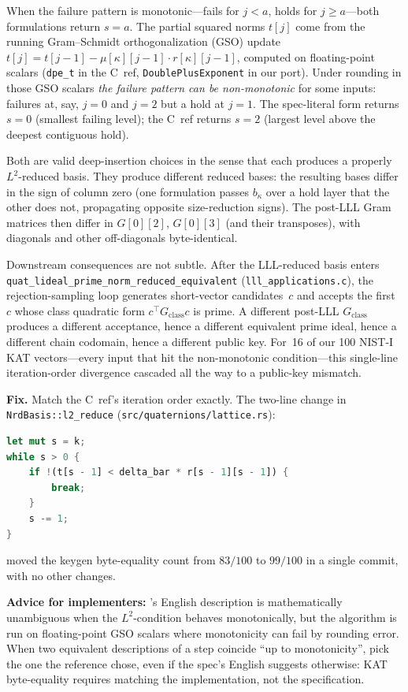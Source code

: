 When the failure pattern is monotonic---fails for $j < a$, holds for
$j \ge a$---both formulations return $s = a$.  The partial squared
norms $t[j]$ come from the running Gram--Schmidt orthogonalization
(GSO) update $t[j] = t[j-1] - \mu[\kappa][j-1] \cdot r[\kappa][j-1]$,
computed on floating-point scalars (\texttt{dpe\_t} in the C~ref,
\texttt{DoublePlusExponent} in our port).  Under rounding in those
GSO scalars \emph{the failure pattern can be non-monotonic} for some
inputs: failures at, say, $j = 0$ and $j = 2$ but a hold at $j = 1$.  The spec-literal form returns $s = 0$
(smallest failing level); the C~ref returns $s = 2$ (largest level
above the deepest contiguous hold).

Both are valid deep-insertion choices in the sense that each
produces a properly $L^2$-reduced basis.  They produce different
reduced bases: the resulting bases differ in the sign of column zero
(one formulation passes $b_\kappa$ over a hold layer that the other
does not, propagating opposite size-reduction signs).  The post-LLL
Gram matrices then differ in $G[0][2]$, $G[0][3]$ (and their
transposes), with diagonals and other off-diagonals byte-identical.

Downstream consequences are not subtle.  After the LLL-reduced basis
enters \texttt{quat\_lideal\_prime\_norm\_reduced\_equivalent}
(\texttt{lll\_applications.c}), the rejection-sampling loop generates
short-vector candidates~$c$ and accepts the first~$c$ whose class
quadratic form $c^\top G_{\mathrm{class}} c$ is prime.  A different
post-LLL $G_{\mathrm{class}}$ produces a different acceptance,
hence a different equivalent prime ideal, hence a different chain
codomain, hence a different public key.  For~16 of our 100 NIST-I
KAT vectors---every input that hit the non-monotonic
condition---this single-line iteration-order divergence cascaded all
the way to a public-key mismatch.

\noindent\textbf{Fix.} Match the C~ref's iteration order exactly.
The two-line change in \texttt{NrdBasis::l2\_reduce}
(\texttt{src/quaternions/lattice.rs}):
\begin{lstlisting}[language=Rust]
let mut s = k;
while s > 0 {
    if !(t[s - 1] < delta_bar * r[s - 1][s - 1]) {
        break;
    }
    s -= 1;
}
\end{lstlisting}
moved the keygen byte-equality count from $83/100$ to $99/100$ in a
single commit, with no other changes.

\noindent\textbf{Advice for implementers:} 's English
description is mathematically unambiguous when the $L^2$-condition
behaves monotonically, but the algorithm is run on floating-point
GSO scalars where monotonicity can fail by rounding error.  When two
equivalent descriptions of a step coincide ``up to monotonicity'',
pick the one the reference chose, even if the spec's English
suggests otherwise: KAT byte-equality requires matching the
implementation, not the specification.

